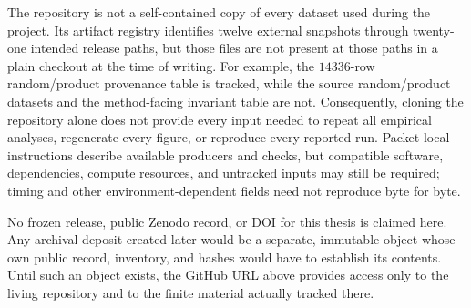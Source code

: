 The repository is not a self-contained copy of every dataset used during the
project.  Its artifact registry identifies twelve external snapshots through
twenty-one intended release paths, but those files are not present at those
paths in a plain checkout at the time of writing.  For example, the
\(14336\)-row random/product provenance table is tracked, while the source
random/product datasets and the method-facing invariant table are not.
Consequently, cloning the repository alone does not provide every input needed
to repeat all empirical analyses, regenerate every figure, or reproduce every
reported run.  Packet-local instructions describe available producers and
checks, but compatible software, dependencies, compute resources, and
untracked inputs may still be required; timing and other
environment-dependent fields need not reproduce byte for byte.

No frozen release, public Zenodo record, or DOI for this thesis is claimed
here.  Any archival deposit created later would be a separate, immutable
object whose own public record, inventory, and hashes would have to establish
its contents.  Until such an object exists, the GitHub URL above provides
access only to the living repository and to the finite material actually
tracked there.
